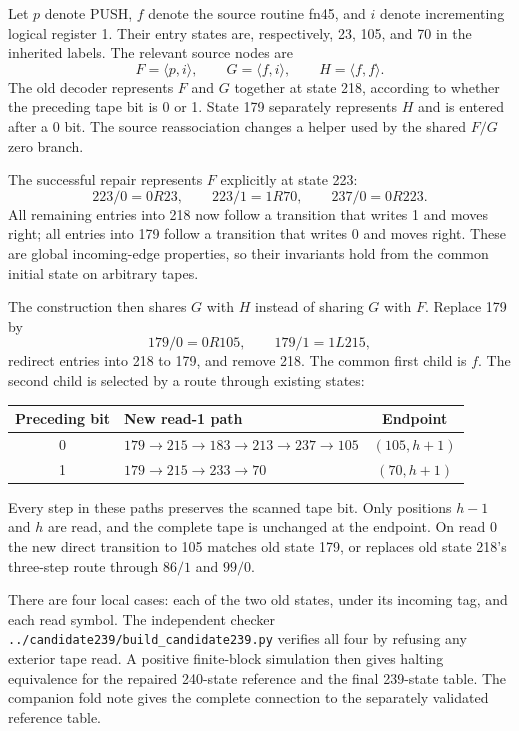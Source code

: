 \documentclass[10pt]{article}
\newcommand{\Seq}[2]{\langle #1,#2\rangle}
\begin{document}
Let $p$ denote PUSH, $f$ denote the source routine fn45, and $i$ denote
incrementing logical register 1. Their entry states are, respectively,
23, 105, and 70 in the inherited labels. The relevant source nodes are
\[
 F=\Seq{p}{i},\qquad G=\Seq{f}{i},\qquad H=\Seq{f}{f}.
\]
The old decoder represents $F$ and $G$ together at state 218, according to
whether the preceding tape bit is 0 or 1. State 179 separately represents $H$
and is entered after a 0 bit. The source reassociation changes a helper used
by the shared $F/G$ zero branch.

The successful repair represents $F$ explicitly at state 223:
\[
 223/0=0R23,\qquad 223/1=1R70,\qquad 237/0=0R223.
\]
All remaining entries into 218 now follow a transition that writes 1 and
moves right; all entries into 179 follow a transition that writes 0 and
moves right. These are global incoming-edge properties, so their invariants
hold from the common initial state on arbitrary tapes.

The construction then shares $G$ with $H$ instead of sharing $G$ with $F$.
Replace 179 by
\[
 179/0=0R105,\qquad 179/1=1L215,
\]
redirect entries into 218 to 179, and remove 218. The common first child is
$f$. The second child is selected by a route through existing states:
\begin{center}
\begin{tabular}{clc}
\toprule
Preceding bit & New read-1 path & Endpoint \\
\midrule
0 & $179\to215\to183\to213\to237\to105$ & $(105,h+1)$ \\
1 & $179\to215\to233\to70$ & $(70,h+1)$ \\
\bottomrule
\end{tabular}
\end{center}
Every step in these paths preserves the scanned tape bit. Only positions
$h-1$ and $h$ are read, and the complete tape is unchanged at the endpoint.
On read 0 the new direct transition to 105 matches old state 179, or replaces
old state 218's three-step route through $86/1$ and $99/0$.

There are four local cases: each of the two old states, under its incoming
tag, and each read symbol. The independent checker
\texttt{../candidate239/build\_candidate239.py} verifies all four by refusing
any exterior tape read. A positive finite-block simulation then gives
halting equivalence for the repaired 240-state reference and the final
239-state table. The companion fold note gives the complete connection to
the separately validated reference table.
\end{document}
